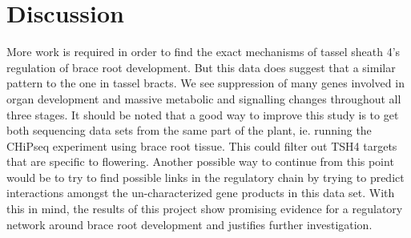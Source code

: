 \section{Discussion}
More work is required in order to find the exact mechanisms of tassel sheath 4's regulation of brace root development. But this data does suggest that a similar pattern to the one in tassel bracts. We see suppression of many genes involved in organ development and massive metabolic and signalling changes throughout all three stages. It should be noted that a good way to improve this study is to get both sequencing data sets from the same part of the plant, ie. running the CHiPseq experiment using brace root tissue. This could filter out TSH4 targets that are specific to flowering. Another possible way to continue from this point would be to try to find possible links in the regulatory chain by trying to predict interactions amongst the un-characterized gene products in this data set. With this in mind, the results of this project show promising evidence for a regulatory network around brace root development and justifies further investigation.   




\printbibliography


